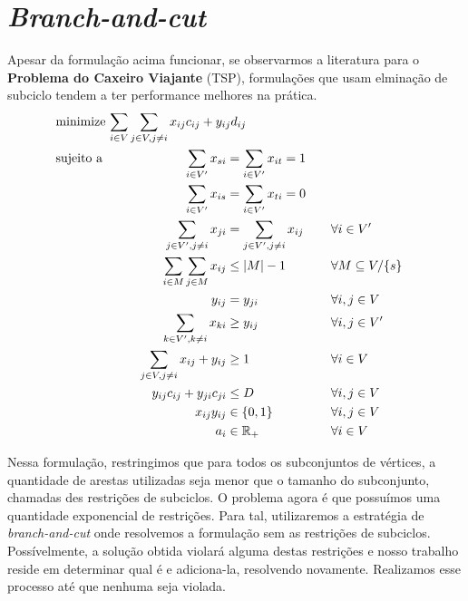 \documentclass[11pt]{article}
\begin{document}
\section{\emph{Branch-and-cut}}
\label{sec:orgd00a974}
Apesar da formulação acima funcionar, se observarmos a literatura para o \textbf{Problema do Caxeiro Viajante} (TSP), formulações que usam elminação de subciclo tendem a ter performance melhores na prática.
\begin{alignat}{4}
& \omit\rlap{minimize  $\displaystyle \sum_{i \in V} \sum_{j \in V ,j \neq i} x_{ij} c_{ij} + y_{ij} d_{ij} $} \\
& \mbox{sujeito a}&& \quad & \sum_{i \in V'} x_{si} &= \sum_{i \in V'} x_{it} = 1                 & \quad &  \\
&                 &&       &  \sum_{i \in V'} x_{is} &= \sum_{i \in V'} x_{ti} = 0                 & \quad &  \\
&                 &&       & \sum_{j \in V', j \neq i} x_{ji} &= \sum_{j \in V', j \neq i} x_{ij}     &       & \forall i \in V'   \\
&                 &&       & \sum_{i \in M} \sum_{j \in M} x_{ij} &\leq |M| -1                                        &       & \forall M \subseteq V /\{s\} \\
&                 &&       & y_{ij} &= y_{ji}                                                   &       & \forall i,j \in V   \\
&                 &&       & \sum_{k \in V', k \neq i} x_{ki} &\geq y_{ij}                                &       & \forall i,j \in V' \\
&                 &&       & \sum_{j \in V, j \neq i} x_{ij} + y_{ij} &\geq 1                        &       & \forall i \in V   \\
&                 &&       & y_{ij} c_{ij} + y_{ji} c_{ji} &\leq D                               &       & \forall i,j \in V  \\
&                 &&       & x_{ij} y_{ij} &\in \{0,1\}                                         &       & \forall i,j \in V \\
&                 &&       & a_i &\in \mathbb{R}_+                                             &         & \forall i \in V
\end{alignat}

Nessa formulação, restringimos que para todos os subconjuntos de vértices, a quantidade de arestas utilizadas seja menor que o tamanho do subconjunto, chamadas des restrições de subciclos.
O problema agora é que possuímos uma quantidade exponencial de restrições.
Para tal, utilizaremos a estratégia de \emph{branch-and-cut} onde resolvemos a formulação sem as restrições de subciclos.
Possívelmente, a solução obtida violará alguma destas restrições e nosso trabalho reside em determinar qual é e adiciona-la, resolvendo novamente.
Realizamos esse processo até que nenhuma seja violada.
\end{document}
